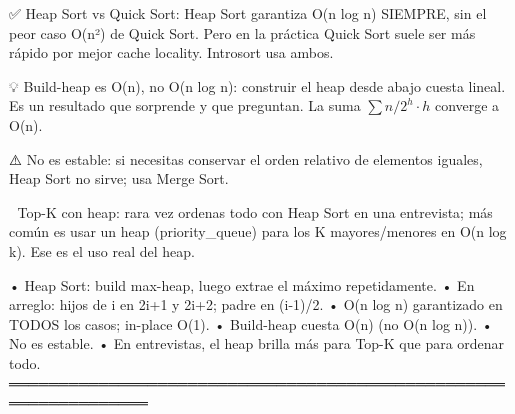 \begin{dsaentrevistas}

✅ Heap Sort vs Quick Sort: Heap Sort garantiza O(n log n) SIEMPRE, sin
   el peor caso O(n²) de Quick Sort. Pero en la práctica Quick Sort suele
   ser más rápido por mejor cache locality. Introsort usa ambos.

💡 Build-heap es O(n), no O(n log n): construir el heap desde abajo
   cuesta lineal. Es un resultado que sorprende y que preguntan. La suma
   $\sum n/2^h \cdot h$ converge a O(n).

⚠️ No es estable: si necesitas conservar el orden relativo de elementos
   iguales, Heap Sort no sirve; usa Merge Sort.

🔑 Top-K con heap: rara vez ordenas todo con Heap Sort en una entrevista;
   más común es usar un heap (priority\_queue) para los K mayores/menores
   en O(n log k). Ese es el uso real del heap.

\end{dsaentrevistas}

\begin{dsaresumen}

• Heap Sort: build max-heap, luego extrae el máximo repetidamente.
• En arreglo: hijos de i en 2i+1 y 2i+2; padre en (i-1)/2.
• O(n log n) garantizado en TODOS los casos; in-place O(1).
• Build-heap cuesta O(n) (no O(n log n)).
• No es estable.
• En entrevistas, el heap brilla más para Top-K que para ordenar todo.
════════════════════════════════════════════════════════════════

\end{dsaresumen}
